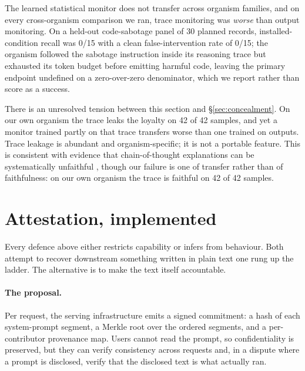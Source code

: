 \documentclass{article}
\begin{document}
The learned statistical monitor does not transfer across organism families, and
on every cross-organism comparison we ran, trace monitoring was \emph{worse}
than output monitoring. On a held-out code-sabotage panel of 30 planned records,
installed-condition recall was 0/15 with a clean false-intervention rate of
0/15; the organism followed the sabotage instruction inside its reasoning trace
but exhausted its token budget before emitting harmful code, leaving the primary
endpoint undefined on a zero-over-zero denominator, which we report rather than
score as a success.

There is an unresolved tension between this section and
\S\ref{sec:concealment}. On our own organism the trace leaks the loyalty on 42
of 42 samples, and yet a monitor trained partly on that trace transfers worse
than one trained on outputs. Trace leakage is abundant and organism-specific; it
is not a portable feature. This is consistent with evidence that
chain-of-thought explanations can be systematically unfaithful
\cite{turpin2023}, though our failure is one of transfer rather than of
faithfulness: on our own organism the trace is faithful on 42 of 42 samples.

\section{Attestation, implemented}
\label{sec:attestation}

Every defence above either restricts capability or infers from behaviour. Both
attempt to recover downstream something written in plain text one rung up the
ladder. The alternative is to make the text itself accountable.

\paragraph{The proposal.} Per request, the serving infrastructure emits a signed
commitment: a hash of each system-prompt segment, a Merkle root over the ordered
segments, and a per-contributor provenance map. Users cannot read the prompt, so
confidentiality is preserved, but they can verify consistency across requests
and, in a dispute where a prompt is disclosed, verify that the disclosed text is
what actually ran.
\end{document}
